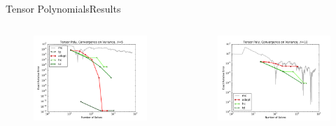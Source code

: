 \documentclass{beamer}
\begin{document}
\begin{frame}{Tensor Polynomials}{Results}%
  \begin{columns}
  \begin{column}{0.5\textwidth}
    \begin{figure}[h!]
      \centering
      \includegraphics[width=\textwidth]{../../graphics/tenspoly_varconv_5}
    \end{figure}
  \end{column}
  \begin{column}{0.5\textwidth}
    \begin{figure}[h!]
      \centering
      \includegraphics[width=\textwidth]{../../graphics/tenspoly_varconv_10}
    \end{figure}
  \end{column}
  \end{columns}
\end{frame}
\end{document}
